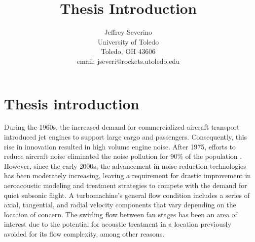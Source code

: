 \documentclass[a4paper]{article}
\begin{document}
\begin{titlepage}

    \title{
    Thesis Introduction}


    \author{ Jeffrey Severino \\
        University of Toledo \\
        Toledo, OH  43606 \\
    email: jseveri@rockets.utoledo.edu}


    \maketitle

\end{titlepage}
\section{Thesis introduction}
During the 1960s, the increased demand for commercialized aircraft transport
introduced jet engines to support large cargo and passengers. Consequently,
this rise in innovation resulted in high volume engine noise. After 1975, 
efforts to reduce aircraft noise eliminated the noise pollution for 90\% of
the population \cite{FAAPolicy}. However, since the early 2000s,
the advancement in noise reduction technologies has been moderately increasing,
leaving a requirement for drastic improvement in aeroacoustic modeling and treatment
strategies to compete with the demand for quiet subsonic flight.  
A turbomachine's general flow condition includes a series of axial, tangential,
and radial velocity components that vary depending on the location of concern.
The swirling flow between fan stages has been an area of interest due to the
potential for acoustic treatment in a location previously avoided for its flow complexity, among 
other reasons.
\end{document}
